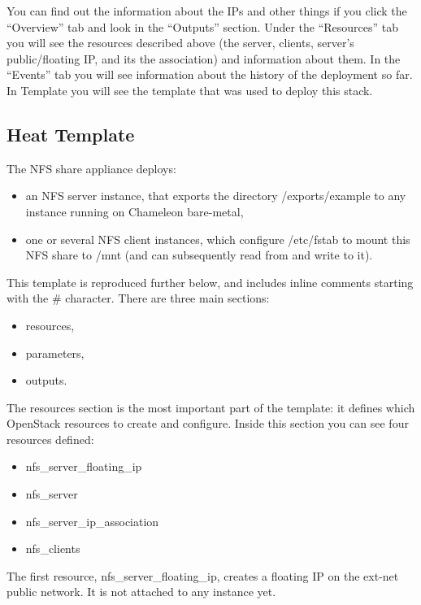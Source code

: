 You can find out the information about the IPs and other things if you
click the ``Overview'' tab and look in the ``Outputs'' section. Under
the ``Resources'' tab you will see the resources described above (the
server, clients, server's public/floating IP, and its the association)
and information about them. In the ``Events'' tab you will see
information about the history of the deployment so far. In Template you
will see the template that was used to deploy this stack.

\subsection{Heat Template}

The NFS share appliance deploys:

\begin{itemize}
\item
  an NFS server instance, that exports the directory /exports/example to
  any instance running on Chameleon bare-metal,
\item
  one or several NFS client instances, which configure /etc/fstab to
  mount this NFS share to /mnt (and can subsequently read from and write
  to it).
\end{itemize}

This template is reproduced further below, and includes inline comments
starting with the \# character. There are three main sections:

\begin{itemize}
\item
  resources,
\item
  parameters,
\item
  outputs.
\end{itemize}

The resources section is the most important part of the template: it
defines which OpenStack resources to create and configure. Inside this
section you can see four resources defined:

\begin{itemize}
\item
  nfs\_server\_floating\_ip
\item
  nfs\_server~
\item
  nfs\_server\_ip\_association
\item
  nfs\_clients
\end{itemize}

The first resource, nfs\_server\_floating\_ip, creates a floating IP on
the ext-net public network. It is not attached to any instance yet.

